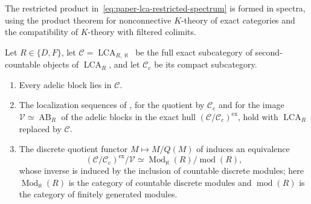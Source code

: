 The restricted product in~\eqref{eq:paper-lca-restricted-spectrum} is formed in spectra, using the product theorem for nonconnective $K$-theory of exact categories and the compatibility of $K$-theory with filtered colimits.

\begin{lemma}\label{lem:paper-lca-countable-localization}
Let $R\in\{D,F\}$, let $\mathcal C=\operatorname{LCA}_{R,\aleph}$ be the full exact subcategory of second-countable objects of $\operatorname{LCA}_R$, and let $\mathcal C_{\mathrm c}$ be its compact subcategory.
\begin{enumerate}
\item Every adelic block lies in $\mathcal C$.
\item The localization sequences of \cite[Proposition 6.3 and Corollary 6.6]{BHRAdeles}, for the quotient by $\mathcal C_{\mathrm c}$ and for the image $\mathcal V\simeq\operatorname{AB}_R$ of the adelic blocks in the exact hull $(\mathcal C/\mathcal C_{\mathrm c})^{\mathrm{ex}}$, hold with $\operatorname{LCA}_R$ replaced by $\mathcal C$.
\item The discrete quotient functor $M\mapsto M/Q(M)$ of \cite[Proposition 2.11]{BHRAdeles} induces an equivalence
\[
 (\mathcal C/\mathcal C_{\mathrm c})^{\mathrm{ex}}/\mathcal V
 \simeq\operatorname{Mod}_\aleph(R)/\operatorname{mod}(R),
\]
whose inverse is induced by the inclusion of countable discrete modules; here $\operatorname{Mod}_\aleph(R)$ is the category of countable discrete modules and $\operatorname{mod}(R)$ is the category of finitely generated modules.
\end{enumerate}
\end{lemma}

